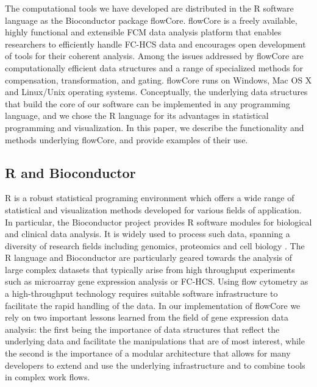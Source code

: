 \documentclass[12pt]{article}
\begin{document}
The computational tools we have developed are distributed in the R
software language as the Bioconductor package flowCore. flowCore is a
freely available, highly functional and extensible FCM data analysis
platform that enables researchers to efficiently handle FC-HCS data
and encourages open development of tools for their coherent
analysis. Among the issues addressed by flowCore are computationally
efficient data structures and a range of specialized methods for
compensation, transformation, and gating.  flowCore runs on Windows,
Mac OS X and Linux/Unix operating systems. Conceptually, the
underlying data structures that build the core of our software can be
implemented in any programming language, and we chose the R language
for its advantages in statistical programming and visualization. In
this paper, we describe the functionality and methods underlying
flowCore, and provide examples of their use.

\subsection*{R and Bioconductor}
R is a robust statistical programing environment which offers a wide
range of statistical and visualization methods developed for various
fields of application. In particular, the Bioconductor project
provides R software modules for biological and clinical data analysis.
It is widely used to process such data, spanning a diversity of
research fields including genomics, proteomics and cell biology
\citep{gentleman2006bos}. The R language and Bioconductor are
particularly geared towards the analysis of large complex datasets
that typically arise from high throughput experiments such as
microarray gene expression analysis or FC-HCS. Using flow cytometry as
a high-throughput technology requires suitable software infrastructure
to facilitate the rapid handling of the data. In our implementation of
flowCore we rely on two important lessons learned from the field of
gene expression data analysis: the first being the importance of data
structures that reflect the underlying data and facilitate the
manipulations that are of most interest, while the second is the
importance of a modular architecture that allows for many developers
to extend and use the underlying infrastructure and to combine tools
in complex work flows.
\end{document}
